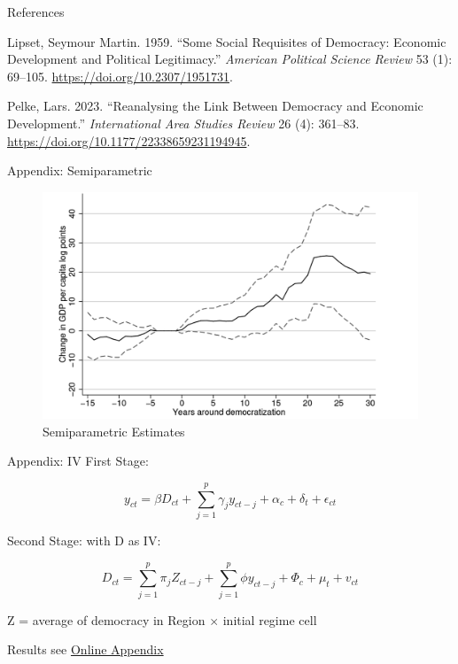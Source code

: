 \documentclass[
  ignorenonframetext,
]{beamer}
\newlength{\cslhangindent}
\newlength{\cslentryspacingunit} %
\newenvironment{CSLReferences}[2] %
 {%
  \setlength{\parindent}{0pt}
  \ifodd #1
  \let\oldpar\par
  \def\par{\hangindent=\cslhangindent\oldpar}
  \fi
  \setlength{\parskip}{#2\cslentryspacingunit}
 }%
 {}
\begin{document}
\begin{frame}{References}
\begin{CSLReferences}{1}{0}
\leavevmode{}%
Lipset, Seymour Martin. 1959. {``Some {Social Requisites} of
{Democracy}: {Economic Development} and {Political Legitimacy}.''}
\emph{American Political Science Review} 53 (1): 69--105.
\url{https://doi.org/10.2307/1951731}.

\leavevmode{}%
Pelke, Lars. 2023. {``Reanalysing the Link Between Democracy and
Economic Development.''} \emph{International Area Studies Review} 26
(4): 361--83. \url{https://doi.org/10.1177/22338659231194945}.

\end{CSLReferences}

\normalsize
\end{frame}

\begin{frame}{Appendix: Semiparametric}
\protect\hypertarget{appendix-semiparametric}{}
\begin{figure}

{\centering \includegraphics{../images/2023-12-05_14-46-53.jpg}

}

\caption{Semiparametric Estimates}

\end{figure}
\end{frame}

\begin{frame}{Appendix: IV}
\protect\hypertarget{appendix-iv}{}
First Stage:

\[
y_{ct} = \beta D_{ct} + \sum_{j=1}^p \gamma_j y_{ct-j} + \alpha_c + \delta_t + \epsilon_{ct}
\]

Second Stage: with D as IV:

\[
D_{ct} = \sum_{j=1}^p \pi_j Z_{ct-j}+ \sum_{j=1}^p \phi y_{ct-j} + \Phi_c+ \mu_t+ v_{ct}
\]

Z = average of democracy in Region \(\times\) initial regime cell

Results see
\href{https://skriptum.github.io/DDCG/vortrag/6-IVReg.html}{Online
Appendix}
\end{frame}
\end{document}
